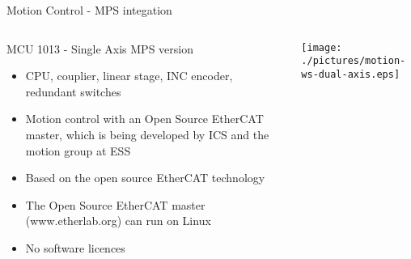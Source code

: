 \documentclass[
  9pt
  , table
  , ignorenonframetext
]{beamer}
\begin{document}
\begin{frame}{Motion Control - MPS integation}
  \begin{columns}
    \begin{column}{.6\textwidth}
      \begin{block}{MCU 1013 - Single Axis MPS version}
        \begin{itemize}
        \item CPU, couplier, linear stage, INC encoder, redundant switches
        \item Motion control with an Open Source EtherCAT master, which is being developed by ICS and the motion group at ESS
        \item Based on the open source EtherCAT technology
        \item The Open Source EtherCAT master (www.etherlab.org) can run on Linux
        \item  No software licences
        \end{itemize}
      \end{block}
    \end{column}
    \begin{column}{.5\textwidth}
      \centering
      \texttt{[image: ./pictures/motion-ws-dual-axis.eps]}
      
    \end{column}
    \end{columns}
\end{frame}


\end{document}

